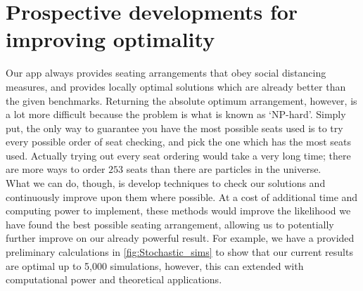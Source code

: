 \documentclass[11pt,a4paper]{article}
\begin{document}
\section*{Prospective developments for improving optimality}
Our app always provides seating arrangements that obey social distancing measures, and provides locally optimal solutions which are already better than the given benchmarks. Returning the  absolute optimum arrangement, however, is a lot more difficult because the problem is what is known as `NP-hard'.  Simply put, the only way to guarantee you have the most possible seats used is to try every possible order of seat checking, and pick the one which has the most seats used. Actually trying out every seat ordering would take a very long time; there are more ways to order $253$ seats than there are particles in the universe.\\

What we can do, though, is develop techniques to check our solutions and continuously improve upon them where possible. At a cost of additional time and computing power to implement, these methods would improve the likelihood we have found the best possible seating arrangement, allowing us to potentially further improve on our already powerful result. For example, we have a provided preliminary calculations in \autoref{fig:Stochastic_sims} to show that our current results are optimal up to 5,000 simulations, however, this can extended with computational power and theoretical applications.\\
\end{document}
